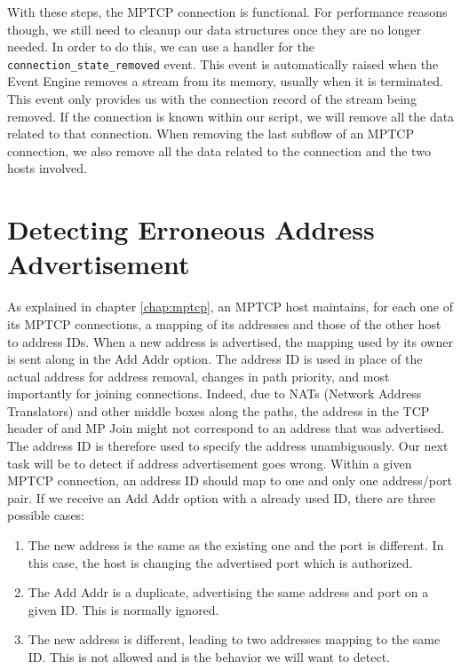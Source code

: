 With these steps, the MPTCP connection is functional. For performance reasons though, we still need to cleanup our data structures once they are no longer needed. In order to do this, we can use a handler for the \texttt{connection\_state\_removed} event. This event is automatically raised when the Event Engine removes a stream from its memory, usually when it is terminated. This event only provides us with the connection record of the stream being removed. If the connection is known within our script, we will remove all the data related to that connection. When removing the last subflow of an MPTCP connection, we also remove all the data related to the connection and the two hosts involved.


\section{Detecting Erroneous Address Advertisement}
As explained in chapter \ref{chap:mptcp}, an MPTCP host maintains, for each one of its MPTCP connections, a mapping of its addresses and those of the other host to address IDs. When a new address is advertised, the mapping used by its owner is sent along in the Add Addr option. The address ID is used in place of the actual address for address removal, changes in path priority, and most importantly for joining connections. Indeed, due to NATs (Network Address Translators) and other middle boxes along the paths, the address in the TCP header of and MP Join might not correspond to an address that was advertised. The address ID is therefore used to specify the address unambiguously. Our next task will be to detect if address advertisement goes wrong. Within a given MPTCP connection, an address ID should map to one and only one address/port pair. If we receive an Add Addr option with a already used ID, there are three possible cases: \\

\begin{enumerate}
\item The new address is the same as the existing one and the port is different. In this case, the host is changing the advertised port which is authorized.
\item The Add Addr is a duplicate, advertising the same address and port on a given ID. This is normally ignored.
\item The new address is different, leading to two addresses mapping to the same ID. This is not allowed and is the behavior we will want to detect.
\end{enumerate} 


